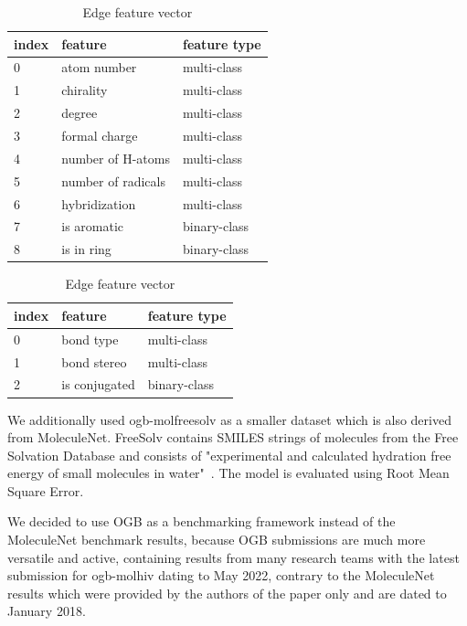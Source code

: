 \begin{table}[!ht]
    \parbox{.49\linewidth}{
        \centering
        \begin{tabular}{lll} %
            \toprule
            index & feature            & feature type \\ \midrule
            0     & atom number        & multi-class  \\
            1     & chirality          & multi-class  \\
            2     & degree             & multi-class  \\
            3     & formal charge      & multi-class  \\
            4     & number of H-atoms  & multi-class  \\
            5     & number of radicals & multi-class  \\
            6     & hybridization      & multi-class  \\
            7     & is aromatic        & binary-class \\
            8     & is in ring         & binary-class \\ \bottomrule
        \end{tabular}
        \caption{Node feature vector}
        \label{table:node_feature_list}
    }
    \hfill
    \parbox{.49\linewidth}{
        \centering
        \begin{tabular}{lll}
            \toprule
            index & feature       & feature type \\\midrule
            0     & bond type     & multi-class  \\
            1     & bond stereo   & multi-class  \\
            2     & is conjugated & binary-class \\\bottomrule
        \end{tabular}
        \caption{Edge feature vector}
        \label{table:edge_feature_list}
    }
\end{table}

We additionally used ogb-molfreesolv as a smaller dataset which is also derived from MoleculeNet. FreeSolv contains SMILES strings of molecules from the Free Solvation Database and consists of "experimental and calculated hydration free energy of small molecules in water"~\cite{2018moleculenet}. The model is evaluated using Root Mean Square Error.

We decided to use OGB as a benchmarking framework instead of the MoleculeNet benchmark results, because OGB submissions are much more versatile and active, containing results from many research teams with the latest submission for ogb-molhiv dating to May 2022, contrary to the MoleculeNet results which were provided by the authors of the paper only and are dated to January 2018.

